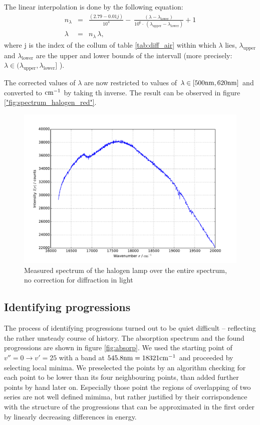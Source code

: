 The linear interpolation is done by the following equation:
\begin{eqnarray}
    n_\lambda &=& \frac{(2.79 - 0.01 j)}{10 ^{4}} - \
    \frac{(\lambda - \lambda_\mathrm{lower})} {10^{6} \cdot \
(\lambda_\mathrm{upper} - \lambda_\mathrm{lower})} + 1 \\
    \lambda &=& n_\lambda \, \lambda,
\end{eqnarray}
where j is the index of the collum of table \ref{tab:diff_air} within which $\lambda$ lies, 
$\lambda_\mathrm{upper}$ and $\lambda_\mathrm{lower}$ are the upper and lower bounds of the 
intervall (more precisely: $\lambda \in (\lambda_\mathrm{upper}, \lambda_\mathrm{lower}]$ ). 

The corrected values of $\lambda$ are now restricted to values of 
$\lambda \in [500\mathrm{nm}, 620\mathrm{nm}]$ and converted to $\mathrm{cm^{-1}}$ by taking th inverse. The result 
can be observed in figure \ref{"fig:spectrum_halogen_red"}.
\begin{figure}
\centering
\includegraphics[width=\pltw]{analysis/figures/halogen_red.pdf}
\caption{Measured spectrum of the halogen lamp over the entire spectrum, no correction for 
diffraction in light}
\label{fig:spectrum_halogen_red}
\end{figure}


\subsection{Identifying progressions}
The process of identifying progressions turned out to be quiet difficult – reflecting the 
rather unsteady course of history. 
The absorption spectrum and the found progressions are shown in figure \ref{fig:absorp}.
We used the starting point of $v'' = 0  \rightarrow v' = 25$ with a band at 
$545.8 \mathrm{nm} = 18321 \mathrm{cm^{-1}}$ and proceeded by selecting local minima. We preselected the points 
by an algorithm checking for each point to be lower than its four neighbouring points, than 
added further points by hand later on. Especially those point the regions of overlapping of two 
series are not well defined mimima, but rather justified by their corrispondence with 
the structure of the progressions that can be approximated in the first order by linearly 
decreasing differences in energy. 



